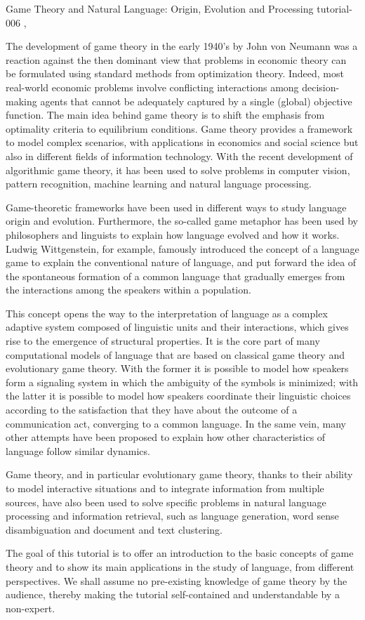 \begin{tutorial}
  {Game Theory and Natural Language: Origin, Evolution and Processing}
  {tutorial-006}
  {\daydateyear, \tutorialafternoontime}
  {\TutLocF}

The development of game theory in the early 1940's by John von Neumann was a reaction against the then dominant view that problems in economic theory can be formulated using standard methods from optimization theory. Indeed, most real-world economic problems involve conflicting interactions among decision-making agents that cannot be adequately captured by a single (global) objective function. The main idea behind game theory is to shift the emphasis from optimality criteria to equilibrium conditions. Game theory provides a framework to model complex scenarios, with applications in economics and social science but also in different fields of information technology. With the recent development of algorithmic game theory, it has been used to solve problems in computer vision, pattern recognition, machine learning and natural language processing.

Game-theoretic frameworks have been used in different ways to study language origin and evolution. Furthermore, the so-called game metaphor has been used by philosophers and linguists to explain how language evolved and how it works. Ludwig Wittgenstein, for example, famously introduced the concept of a language game to explain the conventional nature of language, and put forward the idea of the spontaneous formation of a common language that gradually emerges from the interactions among the speakers within a population.

This concept opens the way to the interpretation of language as a complex adaptive system composed of linguistic units and their interactions, which gives rise to the emergence of structural properties. It is the core part of many computational models of language that are based on classical game theory and evolutionary game theory. With the former it is possible to model how speakers form a signaling system in which the ambiguity of the symbols is minimized; with the latter it is possible to model how speakers coordinate their linguistic choices according to the satisfaction that they have about the outcome of a communication act, converging to a common language. In the same vein, many other attempts have been proposed to explain how other characteristics of language follow similar dynamics.

Game theory, and in particular evolutionary game theory, thanks to their ability to model interactive situations and to integrate information from multiple sources, have also been used to solve specific problems in natural language processing and information retrieval, such as language generation, word sense disambiguation and document and text clustering.

The goal of this tutorial is to offer an introduction to the basic concepts of game theory and to show its main applications in the study of language, from different perspectives. We shall assume no pre-existing knowledge of game theory by the audience, thereby making the tutorial self-contained and understandable by a non-expert. 

\end{tutorial} 

